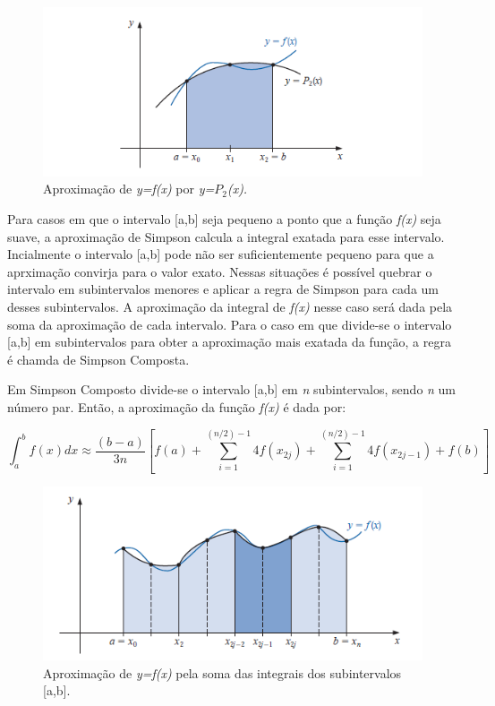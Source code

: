 \documentclass[12pt,a4paper]{article}
\begin{document}
\begin{figure}[h]
\includegraphics{images/simpsonapproximation}
\caption{Aproximação de \textit{y=f(x)} por \textit{y=$P_{2}$(x).}}
\end{figure}


\quad Para casos em que o intervalo [a,b] seja pequeno a ponto que a função \textit{f(x)} seja suave, a aproximação de Simpson calcula a integral exatada para esse intervalo. Incialmente o intervalo [a,b] pode não ser suficientemente pequeno para que a aprximação convirja para o valor exato. Nessas situações é possível quebrar o intervalo em subintervalos menores e aplicar a regra de Simpson para cada um desses subintervalos. A aproximação da integral de \textit{f(x)} nesse caso será dada pela soma da aproximação de cada intervalo. Para o caso em que divide-se o intervalo [a,b] em subintervalos para obter a aproximação mais exatada da função, a regra é chamda de Simpson Composta.\\

\newpage

\quad Em Simpson Composto divide-se o intervalo [a,b] em \textit{n} subintervalos, sendo \textit{n} um número par. Então, a aproximação da função \textit{f(x)} é dada por:

\begin{equation}
\int_{a}^{b} f(x)dx \approx \dfrac{(b-a)}{3n} [f(a) + \sum_{i=1}^{(n/2)-1}4f(x_{2j})+ \sum_{i=1}^{(n/2)-1}4f(x_{2j-1}) + f(b)] 
\end{equation}

\begin{figure}[h]
\includegraphics{images/simpsoncompositeapproximation}
\caption{Aproximação de \textit{y=f(x)} pela soma das integrais dos subintervalos [a,b].}
\end{figure}
\end{document}
